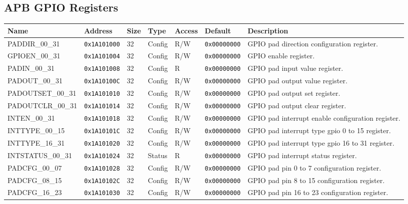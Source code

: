
\subsection{APB GPIO Registers}
{\small
\begin{tabularx}{\textwidth}{|l|l|l|l|l|l|X|}
  \hline
  \textbf{Name} & \textbf{Address}  & \textbf{Size} & \textbf{Type} & \textbf{Access} & \textbf{Default} & \textbf{Description} \\
  \hline
  PADDIR\_00\_31 & \texttt{0x1A101000} & 32 & Config & R/W & \texttt{0x00000000} & GPIO pad direction configuration register.\\
  \hline
  GPIOEN\_00\_31 & \texttt{0x1A101004} & 32 & Config & R/W & \texttt{0x00000000} & GPIO enable register.\\
  \hline
  PADIN\_00\_31 & \texttt{0x1A101008} & 32 & Config & R & \texttt{0x00000000} & GPIO pad input value register.\\
  \hline
  PADOUT\_00\_31 & \texttt{0x1A10100C} & 32 & Config & R/W & \texttt{0x00000000} & GPIO pad output value register.\\
  \hline
  PADOUTSET\_00\_31 & \texttt{0x1A101010} & 32 & Config & R/W & \texttt{0x00000000} & GPIO pad output set register.\\
  \hline
  PADOUTCLR\_00\_31 & \texttt{0x1A101014} & 32 & Config & R/W & \texttt{0x00000000} & GPIO pad output clear register.\\
  \hline
  INTEN\_00\_31 & \texttt{0x1A101018} & 32 & Config & R/W & \texttt{0x00000000} & GPIO pad interrupt enable configuration register.\\
  \hline
  INTTYPE\_00\_15 & \texttt{0x1A10101C} & 32 & Config & R/W & \texttt{0x00000000} & GPIO pad interrupt type gpio 0 to 15 register.\\
  \hline
  INTTYPE\_16\_31 & \texttt{0x1A101020} & 32 & Config & R/W & \texttt{0x00000000} & GPIO pad interrupt type gpio 16 to 31 register.\\
  \hline
  INTSTATUS\_00\_31 & \texttt{0x1A101024} & 32 & Status & R & \texttt{0x00000000} & GPIO pad interrupt status register.\\
  \hline
  PADCFG\_00\_07 & \texttt{0x1A101028} & 32 & Config & R/W & \texttt{0x00000000} & GPIO pad pin 0 to 7 configuration register.\\
  \hline
  PADCFG\_08\_15 & \texttt{0x1A10102C} & 32 & Config & R/W & \texttt{0x00000000} & GPIO pad pin 8 to 15 configuration register.\\
  \hline
  PADCFG\_16\_23 & \texttt{0x1A101030} & 32 & Config & R/W & \texttt{0x00000000} & GPIO pad pin 16 to 23 configuration register.\\

\end{tabularx}}
